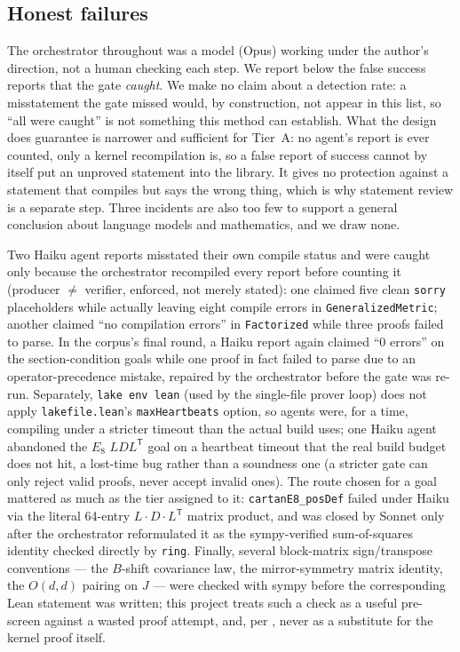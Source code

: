 \documentclass[11pt,a4paper]{article}
\theoremstyle{remark}
\begin{document}
\subsection{Honest failures}
The orchestrator throughout was a model (Opus) working under the author's direction, not a human
checking each step. We report below the false success reports that the gate \emph{caught}. We make
no claim about a detection rate: a misstatement the gate missed would, by construction, not appear in
this list, so ``all were caught'' is not something this method can establish. What the design does
guarantee is narrower and sufficient for Tier~A: no agent's report is ever counted, only a kernel
recompilation is, so a false report of success cannot by itself put an unproved statement into the
library. It gives no protection against a statement that compiles but says the wrong thing, which is
why statement review is a separate step. Three incidents are also too few to support a general
conclusion about language models and mathematics, and we draw none.

Two Haiku agent reports misstated their own compile status and were caught only because the
orchestrator recompiled every report before counting it (producer $\ne$ verifier, enforced, not
merely stated): one claimed five clean \texttt{sorry} placeholders while actually leaving eight
compile errors in \texttt{GeneralizedMetric}; another claimed ``no compilation errors'' in
\texttt{Factorized} while three proofs failed to parse. In the corpus's final round, a Haiku report
again claimed ``0 errors'' on the section-condition goals while one proof in fact failed to parse
due to an operator-precedence mistake, repaired by the orchestrator before the gate was re-run.
Separately, \texttt{lake env lean} (used by the single-file prover loop) does not apply
\texttt{lakefile.lean}'s \texttt{maxHeartbeats} option, so agents were, for a time, compiling under
a stricter timeout than the actual build uses; one Haiku agent abandoned the $E_8$ $LDL^{\mathsf T}$
goal on a heartbeat timeout that the real build budget does not hit, a lost-time bug rather than a
soundness one (a stricter gate can only reject valid proofs, never accept invalid ones). The route
chosen for a goal mattered as much as the tier assigned to it: \texttt{cartanE8\_posDef} failed
under Haiku via the literal 64-entry $L\cdot D\cdot L^{\mathsf T}$ matrix product, and was closed by
Sonnet only after the orchestrator reformulated it as the sympy-verified sum-of-squares identity
checked directly by \texttt{ring}. Finally, several block-matrix sign/transpose conventions ---
the $B$-shift covariance law, the mirror-symmetry matrix identity, the $O(d,d)$ pairing on
$J$ --- were checked with sympy before the corresponding Lean statement was written; this project
treats such a check as a useful pre-screen against a wasted proof attempt, and, per
, never as a substitute for the kernel proof itself.
\end{document}
